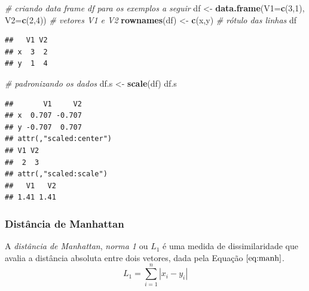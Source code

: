 \documentclass[
]{book}
\newenvironment{Shaded}{\begin{snugshade}}{\end{snugshade}}
\newcommand{\CommentTok}[1]{\textcolor[rgb]{0.56,0.35,0.01}{\textit{#1}}}
\newcommand{\DataTypeTok}[1]{\textcolor[rgb]{0.13,0.29,0.53}{#1}}
\newcommand{\DecValTok}[1]{\textcolor[rgb]{0.00,0.00,0.81}{#1}}
\newcommand{\KeywordTok}[1]{\textcolor[rgb]{0.13,0.29,0.53}{\textbf{#1}}}
\newcommand{\NormalTok}[1]{#1}
\newcommand{\StringTok}[1]{\textcolor[rgb]{0.31,0.60,0.02}{#1}}
\theoremstyle{definition}
\theoremstyle{definition}
\theoremstyle{definition}
\theoremstyle{remark}
\begin{document}
\begin{Shaded}
\begin{Highlighting}[]
\CommentTok{\# criando data frame \textquotesingle{}df\textquotesingle{} para os exemplos a seguir}
\NormalTok{df \textless{}{-}}\StringTok{ }\KeywordTok{data.frame}\NormalTok{(}\DataTypeTok{V1=}\KeywordTok{c}\NormalTok{(}\DecValTok{3}\NormalTok{,}\DecValTok{1}\NormalTok{), }\DataTypeTok{V2=}\KeywordTok{c}\NormalTok{(}\DecValTok{2}\NormalTok{,}\DecValTok{4}\NormalTok{))  }\CommentTok{\# vetores V1 e V2}
\KeywordTok{rownames}\NormalTok{(df) \textless{}{-}}\StringTok{ }\KeywordTok{c}\NormalTok{(}\StringTok{\textquotesingle{}x\textquotesingle{}}\NormalTok{,}\StringTok{\textquotesingle{}y\textquotesingle{}}\NormalTok{)  }\CommentTok{\# rótulo das linhas}
\NormalTok{df}
\end{Highlighting}
\end{Shaded}

\begin{verbatim}
##   V1 V2
## x  3  2
## y  1  4
\end{verbatim}

\begin{Shaded}
\begin{Highlighting}[]
\CommentTok{\# padronizando os dados}
\NormalTok{df.s \textless{}{-}}\StringTok{ }\KeywordTok{scale}\NormalTok{(df)}
\NormalTok{df.s}
\end{Highlighting}
\end{Shaded}

\begin{verbatim}
##       V1     V2
## x  0.707 -0.707
## y -0.707  0.707
## attr(,"scaled:center")
## V1 V2 
##  2  3 
## attr(,"scaled:scale")
##   V1   V2 
## 1.41 1.41
\end{verbatim}

\hypertarget{distuxe2ncia-de-manhattan}{%
\subsubsection*{Distância de Manhattan}\label{distuxe2ncia-de-manhattan}}

A \emph{distância de Manhattan}, \emph{norma 1} ou \(L_1\) é uma medida de dissimilaridade que avalia a distância absoluta entre dois vetores, dada pela Equação \(\eqref{eq:manh}\).
\begin{equation}
L_1 = \sum_{i=1}^{n} |x_i - y_i|
\label{eq:manh}
\end{equation}
\end{document}
